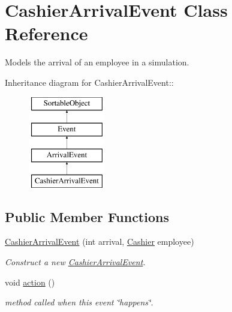 \hypertarget{class_cashier_arrival_event}{
\section{CashierArrivalEvent Class Reference}
\label{class_cashier_arrival_event}
}
Models the arrival of an employee in a simulation.  


Inheritance diagram for CashierArrivalEvent::\begin{figure}[H]
\begin{center}
\leavevmode
\includegraphics[height=4cm]{class_cashier_arrival_event}
\end{center}
\end{figure}
\subsection*{Public Member Functions}
\begin{CompactItemize}
\item 
\hyperlink{class_cashier_arrival_event_8fac3e34862ebd8334291f43d2e2125c}{CashierArrivalEvent} (int arrival, \hyperlink{class_cashier}{Cashier} employee)
\begin{CompactList}\small\item\em Construct a new \hyperlink{class_cashier_arrival_event}{CashierArrivalEvent}. \item\end{CompactList}\item 
void \hyperlink{class_cashier_arrival_event_f3bf40e4e3915f54eb9a24ac816ed0cb}{action} ()
\begin{CompactList}\small\item\em method called when this event \char`\"{}happens\char`\"{}. \item\end{CompactList}\end{CompactItemize}
